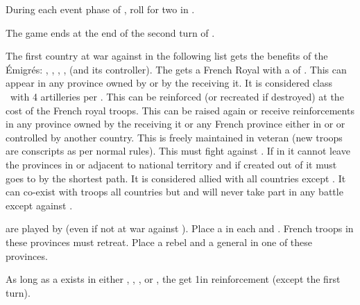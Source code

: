 \begin{digressions}
  \effetlong
  \aparag During each event phase of \monarqueTerror, roll for two \REVOLT in
  \FRA.

  \phpaix
   The game ends at the end of the second turn
  of \monarqueTerror.




  \phadm
  \aparag The first country at war against \FRA in the following list gets the
  benefits of the \'Emigr\'es: \AUS, \PRU, \HIS, \ENG, \payspologne (and its
  controller).
  \aparag The \MAJ gets a French Royal \ARMY\facemoins with a \LeaderG\anonyme
  of \FRA.
  \bparag This \ARMY can appear in any province owned by \FRA or by the \MAJ
  receiving it.
  \bparag It is considered class \CAIII\ with 4 artilleries per
  \ARMY\faceplus.
  \aparag This \ARMY can be reinforced (or recreated if destroyed) at the cost
  of the French royal troops.
  \bparag This \ARMY can be raised again or receive reinforcements in any
  province owned by the \MAJ receiving it or any French province either in
  \REBELLION or \REVOLT or controlled by another country.
  \aparag This \ARMY is freely maintained in veteran (new troops are
  conscripts as per normal rules).
  \aparag This \ARMY must fight against \FRA. If in \FRA it cannot leave the
  provinces in or adjacent to \FRA national territory and if created out of
  \FRA it must goes to \FRA by the shortest path. It is considered allied with
  all countries except \FRA. It can co-exist with troops all countries but
  \FRA and will never take part in any battle except against \FRA.



  \phdipl
  \aparag {} are played by \ENG (even if not at war against
  \FRA).
  \aparag Place a \REBELLION \facemoins in each \provincePoitou and
  \provinceVendee.
  \bparag French troops in these provinces must retreat.
  \aparag Place a rebel \ARMY\faceplus and a general in one of these
  provinces.

  \phadm
  \aparag As long as a \REBELLION exists in either \provincePoitou,
  \provinceVendee, \provinceMorbihan, \provinceArmor or \provinceFinistere,
  the  get 1\LD in reinforcement (except the first turn).


\end{digressions}
